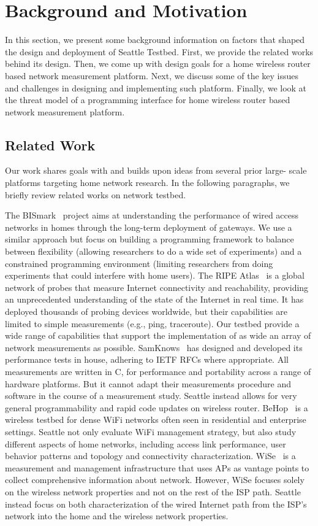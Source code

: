 \section{Background and Motivation}
\label{sec.background_motivation}
In this section, we present some background information on factors that shaped the design and deployment of Seattle Testbed. First, we provide the related works behind its design. Then, we come up with design goals for a home wireless router based network measurement platform. Next, we discuss some of the key issues and  challenges in designing and implementing such platform. Finally, we look at the threat model of a programming interface for home wireless router based network measurement platform.

\subsection{Related Work}
\label{ssec.related_work}
Our work shares goals with and builds upon ideas from several prior large-
scale platforms targeting home network research. In the following paragraphs, we briefly review related works on network testbed. 

The BISmark~\cite{183951} project aims at understanding the performance of 
wired access networks in homes through the long-term deployment of gateways. 
We use a similar approach but focus on building a programming framework to 
balance between flexibility (allowing researchers to do a wide set of 
experiments) and a constrained programming environment (limiting researchers 
from doing experiments that could interfere with home users). The RIPE Atlas~\cite{ripeatlas} is a global network of probes that measure Internet 
connectivity and reachability, providing an unprecedented understanding of 
the state of the Internet in real time. It has deployed thousands of probing 
devices worldwide, but their capabilities are limited to simple measurements 
(e.g., ping, traceroute). Our testbed provide a wide range of capabilities 
that support the implementation of as wide an array of network measurements 
as possible. SamKnows~\cite{samknows} has designed and developed its 
performance tests in house, adhering to IETF RFCs where appropriate. All 
measurements are written in C, for performance and portability across a 
range of hardware platforms. But it cannot adapt their measurements 
procedure and software in the course of a measurement study. Seattle instead 
allows for very general programmability and rapid code updates on wireless 
router. BeHop~\cite{yiakoumis2014behop} is a wireless testbed for dense WiFi 
networks often seen in residential and enterprise settings. Seattle not only 
evaluate WiFi management strategy, but also study different aspects of home 
networks, including access link performance, user behavior patterns and 
topology and connectivity characterization. WiSe~\cite{patro2013observing} 
is a measurement and management infrastructure that uses APs as vantage 
points to collect comprehensive information about network. However, WiSe 
focuses solely on the wireless network properties and not on the rest of the 
ISP path. Seattle instead focus on both characterization of the wired 
Internet path from the ISP’s network into the home and the wireless network 
properties.

